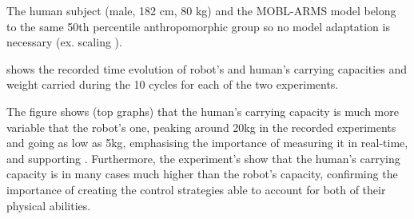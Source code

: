 The human subject (male, 182 cm, 80 kg) and the MOBL-ARMS model belong to the same 50th percentile anthropomorphic group \cite{gordon1989anthropometric} so no model adaptation is necessary (ex. scaling \cite{correa20112782}).

 shows the recorded time evolution of robot's and human's carrying capacities and weight carried during the 10 cycles for each of the two experiments. 

The figure shows (top graphs) that the human's carrying capacity is much more variable that the robot's one, peaking around 20kg in the recorded experiments and going as low as 5kg, emphasising the importance of measuring it in real-time, and supporting . Furthermore, the experiment's show that the human's carrying capacity is in many cases much higher than the robot's capacity, confirming the importance of creating the control strategies able to account for both of their physical abilities. 



